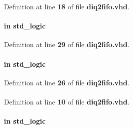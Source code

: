 Definition at line {\bf 18} of file {\bf diq2fifo.\+vhd}.

\paragraph[{mimo\+\_\+en}]{ {\bfseries \textcolor{keywordflow}{in}\textcolor{vhdlchar}{ }} {\bfseries \textcolor{comment}{std\+\_\+logic}\textcolor{vhdlchar}{ }} \hspace{0.3cm}{\ttfamily [Port]}}\label{classdiq2fifo_a0c57670aee4f9fbfa3c286573012965a}


Definition at line {\bf 29} of file {\bf diq2fifo.\+vhd}.

\paragraph[{mode}]{ {\bfseries \textcolor{keywordflow}{in}\textcolor{vhdlchar}{ }} {\bfseries \textcolor{comment}{std\+\_\+logic}\textcolor{vhdlchar}{ }} \hspace{0.3cm}{\ttfamily [Port]}}\label{classdiq2fifo_a219fe733f94bce997e904a6e45b1ac19}


Definition at line {\bf 26} of file {\bf diq2fifo.\+vhd}.

\paragraph[{numeric\+\_\+std}]{\hspace{0.3cm}{\ttfamily [Package]}}\label{classdiq2fifo_a2edc34402b573437d5f25fa90ba4013e}


Definition at line {\bf 10} of file {\bf diq2fifo.\+vhd}.

\paragraph[{reset\+\_\+n}]{ {\bfseries \textcolor{keywordflow}{in}\textcolor{vhdlchar}{ }} {\bfseries \textcolor{comment}{std\+\_\+logic}\textcolor{vhdlchar}{ }} \hspace{0.3cm}{\ttfamily [Port]}}\label{classdiq2fifo_a446ea52ed8c4a84181a47d9165ce41a5}


